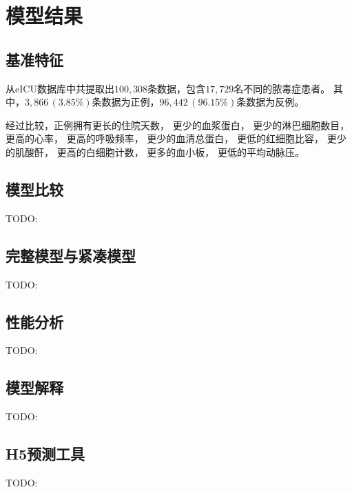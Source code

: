 \section{模型结果}

\NewDocumentCommand{}

\subsection{基准特征}

从eICU数据库中共提取出$100,308$条数据，包含$17,729$名不同的脓毒症患者。%
其中，$3,866\,(3.85\%)$条数据为正例，$96,442\,(96.15\%)$条数据为反例。

经过比较，正例拥有更长的住院天数，%
更少的血浆蛋白，%
更少的淋巴细胞数目，%
更高的心率，%
更高的呼吸频率，%
更少的血清总蛋白，%
更低的红细胞比容，%
更少的肌酸酐，%
更高的白细胞计数，%
更多的血小板，%
更低的平均动脉压。

\subsection{模型比较}

TODO:

\subsection{完整模型与紧凑模型}

TODO:

\subsection{性能分析}

TODO:

\subsection{模型解释}

TODO:

\subsection{H5预测工具}

TODO:
